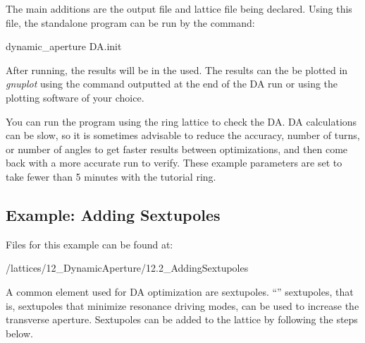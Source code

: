 \documentclass{hitec}     %
\begin{document}
{{{{The main additions are the output file and lattice file being declared. Using this file, the standalone program can be run by the command:
\begin{code}
dynamic_aperture DA.init
\end{code}
After running, the results will be in the  used. The results can the be plotted in \textit{gnuplot} using the command outputted at the end of the DA run or using the plotting software of your choice.

You can run the program using the ring lattice to check the DA. DA calculations can be slow, so it is sometimes advisable to reduce the accuracy, number of turns, or number of angles  to get faster results between optimizations, and then come back with a more accurate run to verify. These example parameters are set to take fewer than 5 minutes with the tutorial ring.

\subsection{Example: Adding Sextupoles}

Files for this example can be found at: 
\begin{code}
/lattices/12_DynamicAperture/12.2_AddingSextupoles
\end{code}
A common element used for DA optimization are sextupoles. ``'' sextupoles, that is, sextupoles that minimize resonance driving modes, can be used to increase the transverse aperture. Sextupoles can be added to the lattice by following the steps below.

}}}}
\end{document}
